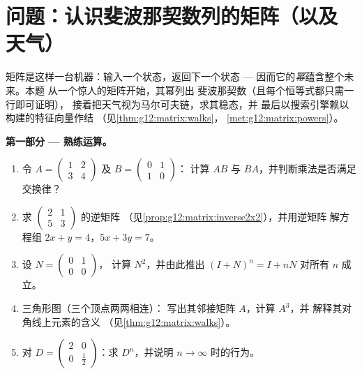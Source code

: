 \section{问题：认识斐波那契数列的矩阵（以及
天气）}

\begin{problem}
\label{pb:g12:matrix:1}
矩阵是这样一台机器：输入一个状态，返回下一个状态
--- 因而它的\emph{幂}蕴含整个未来。本题
从一个惊人的矩阵开始，其幂列出
斐波那契数（且每个恒等式都只需一行即可证明），
接着把天气视为马尔可夫链，求其稳态，并
最后以搜索引擎赖以构建的特征向量作结
（见\cref{thm:g12:matrix:walks}，
\cref{met:g12:matrix:powers}）。

\medskip
\noindent\textbf{第一部分 --- 熟练运算。}
\begin{enumerate}
  \item 令 $A = \begin{pmatrix} 1 & 2\\ 3 & 4\end{pmatrix}$
        及 $B = \begin{pmatrix} 0 & 1\\ 1 & 0\end{pmatrix}$：
        计算 $AB$ 与 $BA$，并判断乘法是否满足交换律？
  \item 求 $\begin{pmatrix} 2 & 1\\ 5 & 3\end{pmatrix}$ 的逆矩阵
        （见\cref{prop:g12:matrix:inverse2x2}），并用逆矩阵
        解方程组 $2x + y = 4$，$5x + 3y = 7$。
  \item 设 $N = \begin{pmatrix} 0 & 1\\ 0 & 0\end{pmatrix}$，
        计算 $N^2$，并由此推出
        $(I + N)^n = I + nN$ 对所有 $n$ 成立。
  \item 三角形图（三个顶点两两相连）：
        写出其邻接矩阵 $A$，计算 $A^3$，并
        解释其对角线上元素的含义
        （见\cref{thm:g12:matrix:walks}）。
  \item 对 $D = \begin{pmatrix} 2 & 0\\ 0 & \frac12
        \end{pmatrix}$：求 $D^n$，并说明
        $n \to \infty$ 时的行为。
\end{enumerate}


\end{problem}
